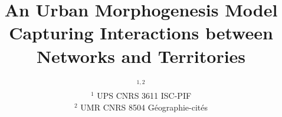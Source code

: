 


\title{An Urban Morphogenesis Model Capturing Interactions between Networks and Territories}
\author{$^{1,2}$\\
$^1$ UPS CNRS 3611 ISC-PIF\\
$^2$ UMR CNRS 8504 G{\'e}ographie-cit{\'e}s
}
\date{}

\maketitle

\justify




